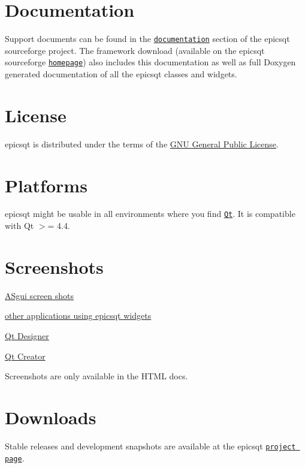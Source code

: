 \hypertarget{index_documentation}{}\section{Documentation}\label{index_documentation}
Support documents can be found in the \href{https://sourceforge.net/projects/epicsqt/files/documentation/}{\tt documentation} section of the epicsqt sourceforge project. The framework download (available on the epicsqt sourceforge \href{https://sourceforge.net/projects/epicsqt/}{\tt homepage}) also includes this documentation as well as full Doxygen generated documentation of all the epicsqt classes and widgets.\hypertarget{index_license}{}\section{License}\label{index_license}
epicsqt is distributed under the terms of the \hyperlink{epicsqtlicense}{GNU General Public License}.\hypertarget{index_platforms}{}\section{Platforms}\label{index_platforms}
epicsqt might be usable in all environments where you find \href{http://www.trolltech.com/products/qt}{\tt Qt}. It is compatible with Qt $>$= 4.4.\hypertarget{index_screenshotsonmainpage}{}\section{Screenshots}\label{index_screenshotsonmainpage}

\begin{DoxyItemize}
\item \hyperlink{ASguiscreenshots}{ASgui screen shots}\par

\item \hyperlink{otherappscreenshots}{other applications using epicsqt widgets}\par

\item \hyperlink{designerscreenshots}{Qt Designer}\par

\item \hyperlink{qtcreatorscreenshots}{Qt Creator}\par

\end{DoxyItemize}

 Screenshots are only available in the HTML docs.\hypertarget{index_downloads}{}\section{Downloads}\label{index_downloads}
Stable releases and development snapshots are available at the epicsqt \href{http://sourceforge.net/projects/epicsqt}{\tt project page}.

